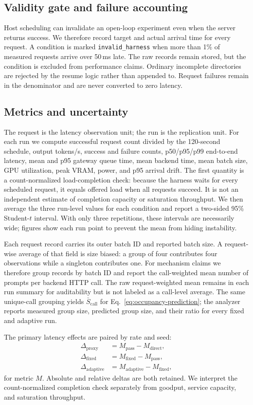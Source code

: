 \subsection{Validity gate and failure accounting}

Host scheduling can invalidate an open-loop experiment even when the server
returns success. We therefore record target and actual arrival time for every
request. A condition is marked \texttt{invalid\_harness} when more than 1\%
of measured requests arrive over 50\,ms late. The raw records remain stored,
but the condition is excluded from performance claims. Ordinary incomplete
directories are rejected by the resume logic rather than appended to. Request
failures remain in the denominator and are never converted to zero latency.

\subsection{Metrics and uncertainty}

The request is the latency observation unit; the run is the replication unit.
For each run we compute successful request count divided by the 120-second
schedule, output tokens/s, success and failure counts, p50/p95/p99 end-to-end
latency, mean and p95 gateway queue time, mean backend time, mean batch size,
GPU utilization, peak VRAM, power, and p95 arrival drift. The first quantity is
a count-normalized load-completion check: because the harness waits for every
scheduled request, it equals offered load when all requests succeed. It is not
an independent estimate of completion capacity or saturation throughput. We
then average the three run-level values for each condition and report a
two-sided 95\% Student-$t$ interval. With only three repetitions, these
intervals are necessarily wide; figures show each run point to prevent the
mean from hiding instability.

Each request record carries its outer batch ID and reported batch size. A
request-wise average of that field is size biased: a group of four contributes
four observations while a singleton contributes one. For mechanism claims we
therefore group records by batch ID and report the call-weighted mean number of
prompts per backend HTTP call. The raw request-weighted mean remains in each
run summary for auditability but is not labeled as a call-level average. The
same unique-call grouping yields $\bar S_{\mathrm{call}}$ for
Eq.~\ref{eq:occupancy-prediction}; the analyzer reports measured group size,
predicted group size, and their ratio for every fixed and adaptive run.

The primary latency effects are paired by rate and seed:
\begin{align}
  \Delta_{\mathrm{proxy}} &= M_{\mathrm{pass}}-M_{\mathrm{direct}},\\
  \Delta_{\mathrm{fixed}} &= M_{\mathrm{fixed}}-M_{\mathrm{pass}},\\
  \Delta_{\mathrm{adaptive}} &= M_{\mathrm{adaptive}}-M_{\mathrm{fixed}},
\end{align}
for metric $M$. Absolute and relative deltas are both retained. We interpret
the count-normalized completion check separately from goodput, service
capacity, and saturation throughput.
